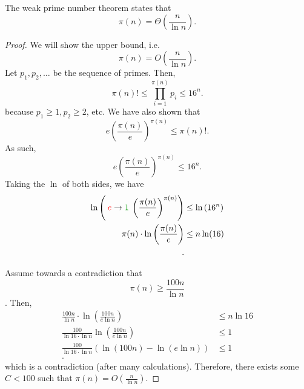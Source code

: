 \begin{theorem}
	The weak prime number theorem states that \[ \pi (n) = \Theta \left(\frac{n}{\ln n}\right) .\]
\end{theorem}
\begin{proof}
	We will show the upper bound, i.e. \[
		\pi (n) = O\left(\frac{n}{\ln n}\right)
	.\] 
	Let \( p_{1},p_{2},\ldots \) be the sequence of primes. Then, \[
		\pi (n)! \le \prod_{i=1}^{\pi (n)}p_i  \le 16^{n} 
	.\] because \( p_{1} \ge 1, p_{2} \ge 2 \), etc. We have also shown that \[
		e\left(\frac{\pi (n)}{e}\right)^{\pi (n)} \le \pi (n)!
	.\] As such, \[
		e\left(\frac{\pi (n)}{e}\right)^{\pi (n)} \le 16^{n} 
	.\] Taking the \( \ln  \) of both sides, we have
	\begin{align*}
		\ln \left( \correct{e}{1} \left( \frac{\pi (n)}{e} \right)^{\pi (n)}  \right) &\le \ln \left( 16^{n}  \right) \\
		\pi (n)\cdot \ln \left( \frac{\pi (n)}{e} \right) &\le n\ln (16) \\
	.\end{align*}

	Assume towards a contradiction that \[ \pi (n) \ge \frac{100n}{\ln n} \]. Then, 
	\begin{align*}
		\frac{100n}{\ln n} \cdot \ln \left( \frac{100n}{e\ln n} \right) &\le n\ln 16 \\
		\frac{100}{\ln 16 \cdot \ln n}\ln \left( \frac{100n}{e\ln n} \right) &\le 1 \\
		\frac{100}{\ln 16\cdot \ln n} (\ln (100n) - \ln (e\ln n)) &\le 1 \\
	.\end{align*}
	which is a contradiction (after many calculations). Therefore, there exists some \( C<100 \) such that \( \pi (n) = O(\frac{n}{\ln n}) \).
\end{proof}
